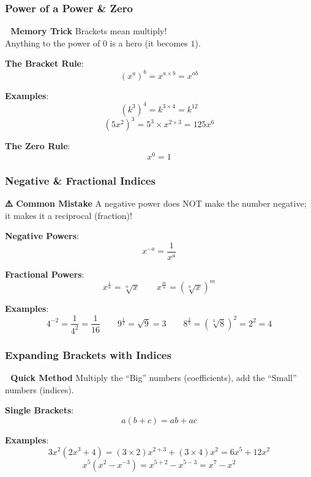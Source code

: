\documentclass[
  letterpaper,
  DIV=11,
  numbers=noendperiod]{scrreprt}
\theoremstyle{definition}
\theoremstyle{remark}
\begin{document}
\subsubsection*{Power of a Power \& Zero}\label{power-of-a-power-zero}

\textbf{🎯 Memory Trick} Brackets mean multiply!\\
Anything to the power of \(0\) is a hero (it becomes \(1\)).

\textbf{The Bracket Rule}: \[(x^a)^b = x^{a \times b} = x^{ab}\]

\textbf{Examples}: \[(k^3)^4 = k^{3 \times 4} = k^{12}\]
\[(5x^2)^3 = 5^3 \times x^{2 \times 3} = 125x^6\]

\textbf{The Zero Rule}: \[x^0 = 1\]

\subsubsection*{Negative \& Fractional
Indices}\label{negative-fractional-indices}

\textbf{⚠️ Common Mistake} A negative power does NOT make the number
negative; it makes it a reciprocal (fraction)!

\textbf{Negative Powers}: \[x^{-a} = \frac{1}{x^a}\]

\textbf{Fractional Powers}:
\[x^{\frac{1}{n}} = \sqrt[n]{x} \qquad x^{\frac{m}{n}} = \left(\sqrt[n]{x}\right)^m\]

\textbf{Examples}:
\[4^{-2} = \frac{1}{4^2} = \frac{1}{16} \qquad 9^{\frac{1}{2}} = \sqrt{9} = 3 \qquad 8^{\frac{2}{3}} = \left(\sqrt[3]{8}\right)^2 = 2^2 = 4\]

\subsubsection*{Expanding Brackets with
Indices}\label{expanding-brackets-with-indices}

\textbf{📝 Quick Method} Multiply the ``Big'' numbers (coefficients),
add the ``Small'' numbers (indices).

\textbf{Single Brackets}: \[a(b + c) = ab + ac\]

\textbf{Examples}:
\[3x^2(2x^3 + 4) = (3 \times 2)x^{2+3} + (3 \times 4)x^2 = 6x^5 + 12x^2\]
\[x^5(x^2 - x^{-3}) = x^{5+2} - x^{5-3} = x^7 - x^2\]
\end{document}
